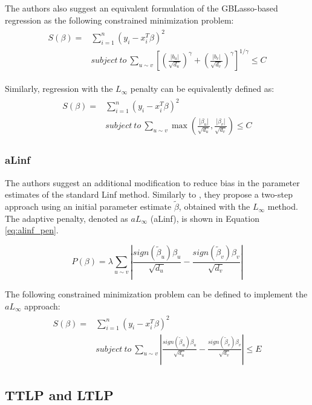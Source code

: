 The authors also suggest an equivalent formulation of the GBLasso-based regression as the following constrained minimization problem:
\begin{align} \label{eq:gblasso_constrained}
\begin{split}
S(\beta) = &\sum_{i=1}^{n} (y_i - x_i^T\beta)^2 \\ 
&subject\ to\ \sum_{u \sim v}
\left[\left(\frac{|b_u|}{\sqrt{d_u}}\right)^\gamma+
\left(\frac{|b_v|}{\sqrt{d_v}}\right)^\gamma\right]^{1/\gamma}\leq C
\end{split}
\end{align}

Similarly, regression with the $L_\infty$ penalty can be equivalently defined as:
\begin{align} \label{eq:linf_constrained}
\begin{split}
S(\beta) = &\sum_{i=1}^{n} (y_i - x_i^T\beta)^2 \\ 
&subject\ to\ \sum_{u \sim v}\max\left(\frac{|\beta_u|}{\sqrt{d_u}},\frac{|\beta_v|}{\sqrt{d_v}}\right)\leq C
\end{split}
\end{align}

\subsubsection{aLinf}
The authors suggest an additional modification to reduce bias in the parameter estimates of the standard Linf method. Similarly to \cite{li2010variable}, they propose a two-step approach using an initial parameter estimate $\tilde{\beta}$, obtained with the $L_\infty$ method. The adaptive penalty, denoted as $aL_\infty$ (aLinf), is shown in Equation \ref{eq:alinf_pen}.

\begin{equation} \label{eq:alinf_pen}
P(\beta) = \lambda\sum_{u \sim v}\left|\frac{sign(\tilde{\beta}_u)\beta_u}{\sqrt{d_u}}-\frac{sign(\tilde{\beta}_v)\beta_v}{\sqrt{d_v}}\right|
\end{equation}

The following constrained minimization problem can be defined to implement the $aL_\infty$ approach:
\begin{align} \label{eq:alinf_constrained}
\begin{split}
S(\beta) = &\sum_{i=1}^{n} (y_i - x_i^T\beta)^2 \\ 
&subject\ to\ \sum_{u \sim v}\left|\frac{sign(\tilde{\beta}_u)\beta_u}{\sqrt{d_u}}-\frac{sign(\tilde{\beta}_v)\beta_v}{\sqrt{d_v}}\right|\leq E
\end{split}
\end{align}


\subsection{TTLP and LTLP}

